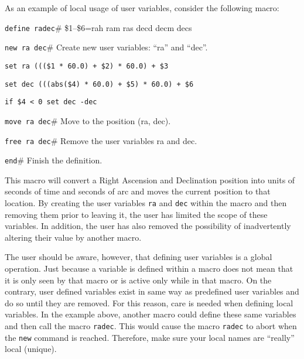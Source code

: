 As an example of local usage of user variables, consider the following macro:
\begin{wiplist}%
  \item [\wipp] {\tt define radec}\hfill\# \$1--\$6=rah ram ras decd decm decs
  \item [\wipd] {\tt new ra dec}\hfill\# Create new user variables:
    ``ra'' and ``dec''.
  \item [\wipd] {\tt set ra (((\$1 * 60.0) + \$2) * 60.0) + \$3}
  \item [\wipd] {\tt set dec (((abs(\$4) * 60.0) + \$5) * 60.0) + \$6}
  \item [\wipd] {\tt if \$4 < 0 set dec -dec}
  \item [\wipd] {\tt move ra dec}\hfill\# Move to the position (ra, dec).
  \item [\wipd] {\tt free ra dec}\hfill\# Remove the user variables ra and dec.
  \item [\wipd] {\tt end}\hfill\# Finish the definition.
\end{wiplist}
This macro will convert a Right Ascension and Declination position
into units of seconds of time and seconds of arc and moves the current
position to that location.
By creating the user variables {\tt ra} and {\tt dec}
within the macro and then removing them prior to leaving it,
the user has limited the scope of these variables.
In addition, the user has also removed the possibility of inadvertently
altering their value by another macro.

The user should be aware, however, that defining user variables is a
global operation.
Just because a variable is defined within a macro does not mean that
it is only seen by that macro or is active only while in that macro.
On the contrary, user defined variables exist in same way as predefined
user variables and do so until they are removed.
For this reason, care is needed when defining local variables.
In the example above,
another macro could define these same variables and then call the macro
{\tt radec}.
This would cause the macro {\tt radec} to abort when
the {\tt new} command is reached.
Therefore, make sure your local names are ``really'' local (\ie unique).
